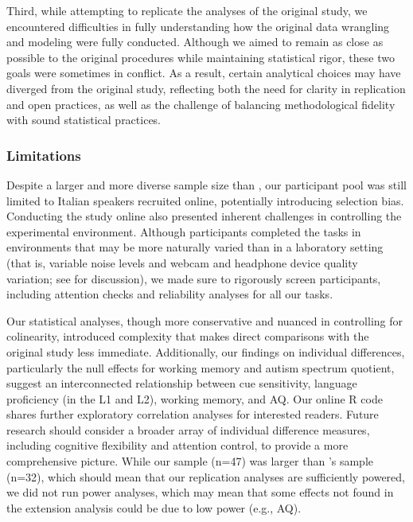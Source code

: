 Third, while attempting to replicate the analyses of the original study, we encountered difficulties in fully understanding how the original data wrangling and modeling were fully conducted. Although we aimed to remain as close as possible to the original procedures while maintaining statistical rigor, these two goals were sometimes in conflict. As a result, certain analytical choices may have diverged from the original study, reflecting both the need for clarity in replication and open practices, as well as the challenge of balancing methodological fidelity with sound statistical practices.

\subsubsection{Limitations}

Despite a larger and more diverse sample size than \cite{Sulpizio_McQueen_2012}, our participant pool was still limited to Italian speakers recruited online, potentially introducing selection bias. Conducting the study online also presented inherent challenges in controlling the experimental environment. Although participants completed the tasks in environments that may be more naturally varied than in a laboratory setting (that is, variable noise levels and webcam and headphone device quality variation; see \cite{bramlett_wiener_24-AOW} for discussion), we made sure to rigorously screen participants, including attention checks and reliability analyses for all our tasks.

Our statistical analyses, though more conservative and nuanced in controlling for colinearity, introduced complexity that makes direct comparisons with the original study less immediate. Additionally, our findings on individual differences, particularly the null effects for working memory and autism spectrum quotient, suggest an interconnected relationship between cue sensitivity, language proficiency (in the L1 and L2), working memory, and AQ. Our online R code shares further exploratory correlation analyses for interested readers. Future research should consider a broader array of individual difference measures, including cognitive flexibility and attention control, to provide a more comprehensive picture. While our sample (n=47) was larger than \cite{Sulpizio_McQueen_2012}'s sample (n=32), which should mean that our replication analyses are sufficiently powered, we did not run power analyses, which may mean that some effects not found in the extension analysis could be due to low power (e.g., AQ).

